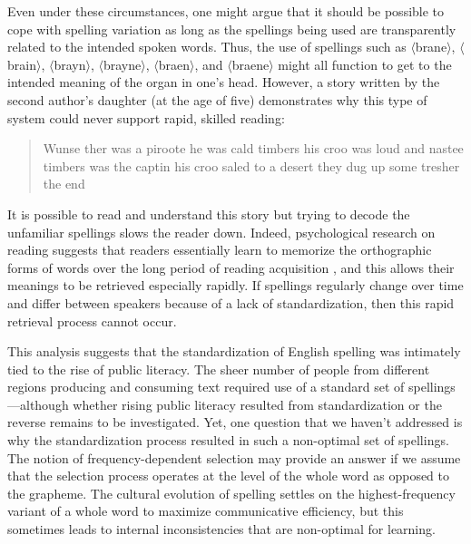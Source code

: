 \documentclass[doc,biblatex]{apa7}
\newcommand\spelling[1]{\allowbreak$\langle$#1$\rangle$}
\begin{document}
Even under these circumstances, one might argue that it should be possible to cope with spelling variation as long as the spellings being used are transparently related to the intended spoken words. Thus, the use of spellings such as \spelling{brane}, \spelling{brain}, \spelling{brayn}, \spelling{brayne}, \spelling{braen}, and \spelling{braene} might all function to get to the intended meaning of the organ in one's head. However, a story written by the second author's daughter (at the age of five) demonstrates why this type of system could never support rapid, skilled reading:
\begin{quote}
Wunse ther was a piroote he was cald timbers his croo was loud and nastee timbers was the captin his croo saled to a desert they dug up some tresher the end
\end{quote}
It is possible to read and understand this story but trying to decode the unfamiliar spellings slows the reader down. Indeed, psychological research on reading suggests that readers essentially learn to memorize the orthographic forms of words over the long period of reading acquisition \parencite[a process called ``orthographic learning'';][]{Castles:2006}, and this allows their meanings to be retrieved especially rapidly. If spellings regularly change over time and differ between speakers because of a lack of standardization, then this rapid retrieval process cannot occur.

This analysis suggests that the standardization of English spelling was intimately tied to the rise of public literacy. The sheer number of people from different regions producing and consuming text required use of a standard set of spellings---although whether rising public literacy resulted from standardization or the reverse remains to be investigated. Yet, one question that we haven't addressed is why the standardization process resulted in such a non-optimal set of spellings. The notion of frequency-dependent selection may provide an answer if we assume that the selection process operates at the level of the whole word as opposed to the grapheme. The cultural evolution of spelling settles on the highest-frequency variant of a whole word to maximize communicative efficiency, but this sometimes leads to internal inconsistencies that are non-optimal for learning.

\end{document}
